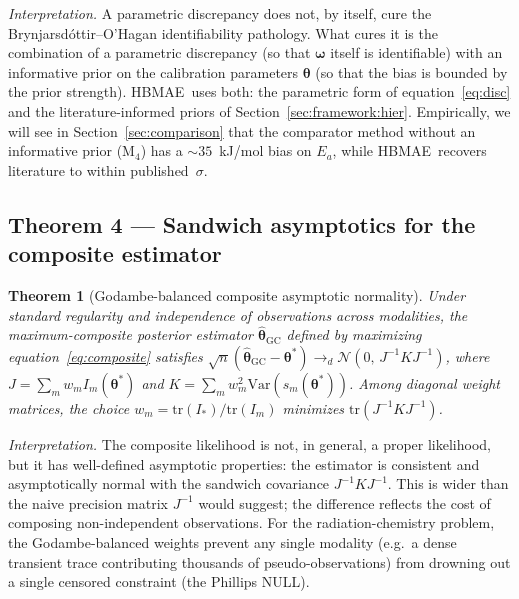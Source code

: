 \documentclass[12pt]{article}
\theoremstyle{plain}
\newtheorem{theorem}{Theorem}
\theoremstyle{definition}
\theoremstyle{remark}
\newcommand{\HBMAE}{HBMAE\xspace}
\begin{document}
\emph{Interpretation.}  A parametric discrepancy does not, by itself, cure
the Brynjarsd\'ottir--O'Hagan identifiability pathology.  What cures it is
the combination of a parametric discrepancy (so that $\boldsymbol\omega$
itself is identifiable) with an informative prior on the calibration
parameters $\boldsymbol\theta$ (so that the bias is bounded by the prior
strength).  \HBMAE\ uses both:  the parametric form of
equation~\eqref{eq:disc} and the literature-informed priors of
Section~\ref{sec:framework:hier}.  Empirically, we will see in
Section~\ref{sec:comparison} that the comparator method without an
informative prior (M$_4$) has a $\sim 35$~kJ/mol bias on $E_a$, while
\HBMAE\ recovers literature to within published~$\sigma$.

\subsection{Theorem 4 --- Sandwich asymptotics for the composite estimator}\label{sec:thm4}

\begin{theorem}[Godambe-balanced composite asymptotic normality]\label{thm:composite}
Under standard regularity and independence of observations across modalities,
the maximum-composite posterior estimator $\hat{\boldsymbol\theta}_{\mathrm{GC}}$
defined by maximizing equation~\eqref{eq:composite} satisfies
$\sqrt{n}(\hat{\boldsymbol\theta}_{\mathrm{GC}} - \boldsymbol\theta^*) \to_d
\mathcal{N}(0,\,J^{-1}KJ^{-1})$, where $J = \sum_m w_m I_m(\boldsymbol\theta^*)$
and $K = \sum_m w_m^2 \mathrm{Var}(s_m(\boldsymbol\theta^*))$.  Among diagonal
weight matrices, the choice $w_m = \mathrm{tr}(I_*)/\mathrm{tr}(I_m)$ minimizes
$\mathrm{tr}(J^{-1}KJ^{-1})$.
\end{theorem}

\emph{Interpretation.}  The composite likelihood is not, in general, a
proper likelihood, but it has well-defined asymptotic properties:  the
estimator is consistent and asymptotically normal with the sandwich
covariance $J^{-1}KJ^{-1}$.  This is wider than the naive precision matrix
$J^{-1}$ would suggest; the difference reflects the cost of composing
non-independent observations.  For the radiation-chemistry problem, the
Godambe-balanced weights prevent any single modality (e.g.\ a dense
transient trace contributing thousands of pseudo-observations) from
drowning out a single censored constraint (the Phillips NULL).
\end{document}
